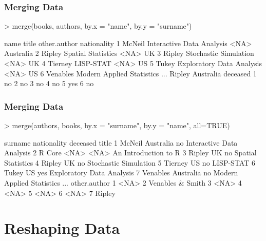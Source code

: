 \documentclass[10pt,slidestop,mathserif,c]{beamer}
\begin{document}
\begin{frame}
	\frametitle{Merging Data}

\begin{Schunk}
\begin{Sinput}
> merge(books, authors, by.x = "name", by.y = "surname")
\end{Sinput}
\begin{Soutput}
      name                         title other.author nationality
1   McNeil     Interactive Data Analysis         <NA>   Australia
2   Ripley            Spatial Statistics         <NA>          UK
3   Ripley         Stochastic Simulation         <NA>          UK
4  Tierney                     LISP-STAT         <NA>          US
5    Tukey     Exploratory Data Analysis         <NA>          US
6 Venables Modern Applied Statistics ...       Ripley   Australia
  deceased
1       no
2       no
3       no
4       no
5      yes
6       no
\end{Soutput}
\end{Schunk}
\end{frame}

\begin{frame}
	\frametitle{Merging Data}

\begin{Schunk}
\begin{Sinput}
> merge(authors, books, by.x = "surname", by.y = "name", all=TRUE)
\end{Sinput}
\begin{Soutput}
   surname nationality deceased                         title
1   McNeil   Australia       no     Interactive Data Analysis
2   R Core        <NA>     <NA>          An Introduction to R
3   Ripley          UK       no            Spatial Statistics
4   Ripley          UK       no         Stochastic Simulation
5  Tierney          US       no                     LISP-STAT
6    Tukey          US      yes     Exploratory Data Analysis
7 Venables   Australia       no Modern Applied Statistics ...
      other.author
1             <NA>
2 Venables & Smith
3             <NA>
4             <NA>
5             <NA>
6             <NA>
7           Ripley
\end{Soutput}
\end{Schunk}
\end{frame}

\section{Reshaping Data}
\end{document}

